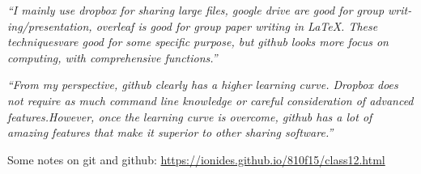 \documentclass[12pt]{beamer}
\newcommand\ans[1]{{\it ``#1''}}
\begin{document}
\begin{frame}
  \ans{I  mainly  use  dropbox  for  sharing  large  files,  google  drive  are  good  for  group  writ-ing/presentation, overleaf is good for group paper writing in LaTeX. These techniquesvare good for some specific purpose, but github looks more focus on computing, with comprehensive functions.}
  
  \end{frame}

\begin{frame}
  \ans{From my perspective,  github clearly has a higher learning curve.  Dropbox does not require as much command line knowledge or careful consideration of advanced features.However, once the learning curve is overcome, github has a lot of amazing features that make it superior to other sharing software.}
  \end{frame}

\begin{frame}
  Some notes on git and github: \url{https://ionides.github.io/810f15/class12.html}
  
\end{frame}
\end{document}
